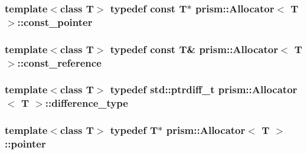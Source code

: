 \subsubsection[{\texorpdfstring{const\+\_\+pointer}{const_pointer}}]{\setlength{\rightskip}{0pt plus 5cm}template$<$class T$>$ typedef const T$\ast$ {\bf prism\+::\+Allocator}$<$ T $>$\+::{\bf const\+\_\+pointer}}\hypertarget{classprism_1_1_allocator_af6a4a91dfc203203ecc319a457ce4dce}{}\label{classprism_1_1_allocator_af6a4a91dfc203203ecc319a457ce4dce}
\subsubsection[{\texorpdfstring{const\+\_\+reference}{const_reference}}]{\setlength{\rightskip}{0pt plus 5cm}template$<$class T$>$ typedef const T\& {\bf prism\+::\+Allocator}$<$ T $>$\+::{\bf const\+\_\+reference}}\hypertarget{classprism_1_1_allocator_a89911899c97ae877a81b798957a2d899}{}\label{classprism_1_1_allocator_a89911899c97ae877a81b798957a2d899}
\subsubsection[{\texorpdfstring{difference\+\_\+type}{difference_type}}]{\setlength{\rightskip}{0pt plus 5cm}template$<$class T$>$ typedef std\+::ptrdiff\+\_\+t {\bf prism\+::\+Allocator}$<$ T $>$\+::{\bf difference\+\_\+type}}\hypertarget{classprism_1_1_allocator_a39ca38c4c741bbc51d3c6e26603102ef}{}\label{classprism_1_1_allocator_a39ca38c4c741bbc51d3c6e26603102ef}
\subsubsection[{\texorpdfstring{pointer}{pointer}}]{\setlength{\rightskip}{0pt plus 5cm}template$<$class T$>$ typedef T$\ast$ {\bf prism\+::\+Allocator}$<$ T $>$\+::{\bf pointer}}\hypertarget{classprism_1_1_allocator_ad3c6706a7243bd3ef489e16d34d5750f}{}\label{classprism_1_1_allocator_ad3c6706a7243bd3ef489e16d34d5750f}
